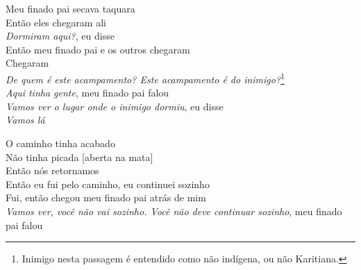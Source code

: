 \noindent   Meu finado pai secava taquara\\
  Então eles chegaram ali\\
  \textit{Dormiram aqui?}, eu disse\\
  Então meu finado pai e os outros chegaram\\
  Chegaram\\
  \textit{De quem é este acampamento? Este acampamento é do inimigo?}\footnote{Inimigo nesta passagem é entendido como não indígena, ou não Karitiana.}\\
  \textit{Aqui tinha gente}, meu finado pai falou\\
  \textit{Vamos ver o lugar onde o inimigo dormiu}, eu disse\\
  \textit{Vamos lá}
 
 \smallskip
 \begin{center}\end{center}
 \smallskip
 
\noindent   O caminho tinha acabado\\
  Não tinha picada {[}aberta na mata{]}\\
  Então nós retornamos\\
  Então eu fui pelo caminho, eu continuei sozinho\\
  Fui, então chegou meu finado pai atrás de mim\\
  \textit{Vamos ver, você não vai sozinho. Você não deve continuar sozinho},
 meu finado pai falou
 

